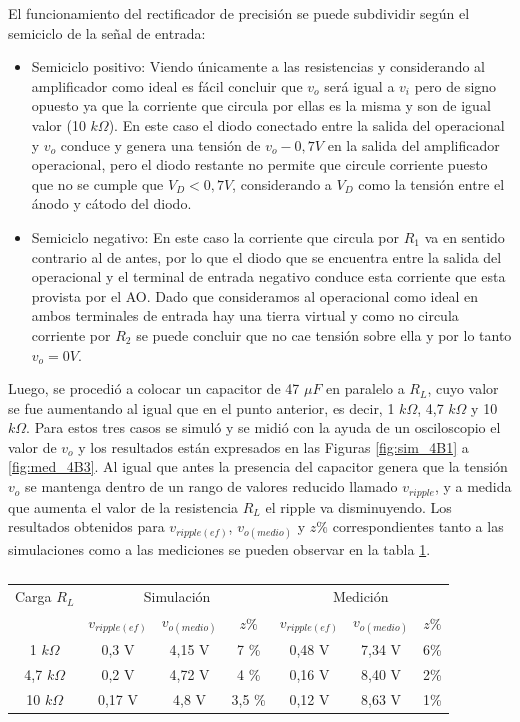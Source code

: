 El funcionamiento del rectificador de precisión se puede subdividir según el semiciclo de la señal de entrada:
\begin{itemize}
  \item Semiciclo positivo: Viendo únicamente a las resistencias y considerando al amplificador como ideal es fácil concluir que $v_{o}$ será igual a $v_{i}$ pero de signo opuesto ya que la corriente que circula por ellas es la misma y son de igual valor (10 $k\Omega$). En este caso el diodo conectado entre la salida del operacional y $v_{o}$ conduce y genera una tensión de $v_{o} - 0,7 V$ en la salida del amplificador operacional, pero el diodo restante no permite que circule corriente puesto que no se cumple que $V_{D} < 0,7 V$, considerando a $V_{D}$ como la tensión entre el ánodo y cátodo del diodo.
  \item Semiciclo negativo: En este caso la corriente que circula por $R_{1}$ va en sentido contrario al de antes, por lo que el diodo que se encuentra entre la salida del operacional y el terminal de entrada negativo conduce esta corriente que esta provista por el AO. Dado que consideramos al operacional como ideal en ambos terminales de entrada hay una tierra virtual y como no circula corriente por $R_{2}$ se puede concluir que no cae tensión sobre ella y por lo tanto $v_{o} = 0 V$.
\end{itemize}

Luego, se procedió a colocar un capacitor de 47 $\mu F$ en paralelo a $R_{L}$, cuyo valor se fue aumentando al igual que en el punto anterior, es decir, 1 $k\Omega$, 4,7 $k\Omega$ y 10 $k\Omega$. Para estos tres casos se simuló y se midió con la ayuda de un osciloscopio el valor de $v_{o}$ y los resultados están expresados en las Figuras \ref{fig:sim_4B1} a \ref{fig:med_4B3}. Al igual que antes la presencia del capacitor genera que la tensión $v_{o}$ se mantenga dentro de un rango de valores reducido llamado $v_{ripple}$, y a medida que aumenta el valor de la resistencia $R_{L}$ el ripple va disminuyendo. Los resultados obtenidos para $v_{ripple(ef)}$, $v_{o(medio)}$ y $z\%$ correspondientes tanto a las simulaciones como a las mediciones se pueden observar en la tabla \ref{table:rect_precision}. \\

\begin{table}
\centering
\begin{tabular}{ccccccc}
\toprule
Carga $R_{L}$  & \multicolumn{3}{c}{Simulación}  & \multicolumn{3}{c}{Medición} \\

             & $v_{ripple(ef)}$    & $v_{o(medio)}$    &   $z\%$	& $v_{ripple(ef)}$    & $v_{o(medio)}$    &   $z\%$ \\
\midrule
1 $k\Omega$            & 0,3 V    & 4,15 V   & 7 \%	& 0,48 V    & 7,34 V   & 6\% \\
4,7 $k\Omega$            & 0,2 V    & 4,72 V   & 4 \%	& 0,16 V    & 8,40 V   & 2\% \\
10 $k\Omega$            & 0,17 V    & 4,8 V   & 3,5 \%	& 0,12 V    & 8,63 V   & 1\% \\
\bottomrule
\end{tabular}
\caption{}
\label{table:rect_precision}
\end{table}

